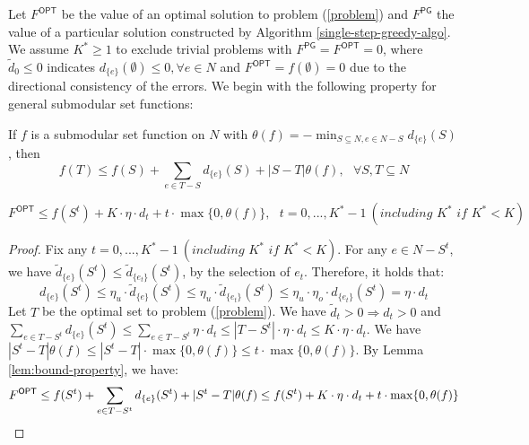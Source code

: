 Let $F^{\textsf{OPT}}$ be the value of an optimal solution to problem (\ref{problem}) and $F^{\textsf{PG}}$ the value of a particular solution constructed by Algorithm \ref{single-step-greedy-algo}. We assume $K^* \geq 1$ to exclude trivial problems with $F^{\textsf{PG}} = F^{\textsf{OPT}} = 0$, where $\tilde{d}_{0} \leq 0$ indicates $d_{\{e\}}(\emptyset) \leq 0, \forall e \in N$ and $F^{\textsf{OPT}} = f(\emptyset) = 0$ due to the directional consistency of the errors. We begin with the following property for general submodular set functions: 

\begin{lemma}  \label{lem:bound-property}
If $f$ is a submodular set function on $N$ with $\theta(f) = - \min_{S \subseteq N, e \in N - S}{d_{\{e\}}{(S)}}$, then
\[ f(T) \leq f(S) + \sum_{e \in T - S}{d_{\{e\}}(S)} + |S-T| \theta(f), ~~~ \forall S, T \subseteq N \]
\end{lemma}



\begin{lemma} \label{lem:bounds on f(S^t)}
\[ F^{\textsf{OPT}} \leq f(S^t) + K \cdot \eta \cdot d_{t} + t \cdot \max \{ 0, \theta(f) \}, ~~~ t = 0, ..., K^*-1 ~(\textit{including } K^* \textit{ if } K^* < K) \]
\end{lemma}
\begin{proof}
Fix any $t = 0, ..., K^* - 1 ~(\textit{including } K^* \textit{ if } K^* < K)$. 
For any $e \in N - S^t$, we have $\tilde{d}_{\{e\}}(S^{t}) \leq \tilde{d}_{\{e_t\}}(S^{t})$, by the selection of $e_t$. Therefore, it holds that:
\[ d_{\{e\}}(S^t) \leq \eta_u \cdot \tilde{d}_{\{e\}}(S^{t}) \leq \eta_u \cdot \tilde{d}_{\{e_t\}}(S^{t}) \leq \eta_u \cdot \eta_o \cdot {d}_{\{e_t\}}(S^{t}) = \eta \cdot d_t \]
Let $T$ be the optimal set to problem (\ref{problem}). We have $\tilde{d}_t > 0 \Rightarrow d_t > 0$ and $\sum_{e \in T - S^t}{d_{\{e\}}(S^t)} \leq \sum_{e \in T - S^t}{\eta \cdot d_t} \leq |T - S^t| \cdot \eta \cdot d_t \leq K \cdot \eta \cdot d_t$.
We have $|S^t-T| \theta(f) \leq |S^t-T| \cdot \max \{ 0, \theta(f) \} \leq t \cdot \max \{ 0, \theta(f) \}$. 
By Lemma \ref{lem:bound-property}, we have:
\[ F^{\textsf{OPT}} \leq f(S^t) + \sum_{e \in T - S^t}{d_{\{e\}}(S^t)} + |S^t-T| \theta(f) \leq f(S^t) + K \cdot \eta \cdot d_{t} + t \cdot \max \{ 0, \theta(f) \} \qedhere \]
\end{proof}



